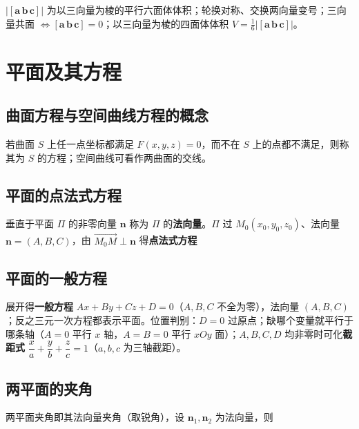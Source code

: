 $|[\boldsymbol a\,\boldsymbol b\,\boldsymbol c]|$ 为以三向量为棱的平行六面体体积；轮换对称、交换两向量变号；三向量共面 $\iff[\boldsymbol a\,\boldsymbol b\,\boldsymbol c]=0$；以三向量为棱的四面体体积 $V=\frac16\bigl|[\boldsymbol a\,\boldsymbol b\,\boldsymbol c]\bigr|$。


\section{平面及其方程}

\subsection{曲面方程与空间曲线方程的概念}

若曲面 $S$ 上任一点坐标都满足 $F(x,y,z)=0$，而不在 $S$ 上的点都不满足，则称其为 $S$ 的方程；空间曲线可看作两曲面的交线。

\subsection{平面的点法式方程}

垂直于平面 $\Pi$ 的非零向量 $\boldsymbol n$ 称为 $\Pi$ 的\textbf{法向量}。$\Pi$ 过 $M_0(x_0,y_0,z_0)$、法向量 $\boldsymbol n=(A,B,C)$，由 $\overrightarrow{M_0M}\perp\boldsymbol n$ 得\textbf{点法式方程}


\subsection{平面的一般方程}

展开得\textbf{一般方程} $Ax+By+Cz+D=0$（$A,B,C$ 不全为零），法向量 $(A,B,C)$；反之三元一次方程都表示平面。位置判别：$D=0$ 过原点；缺哪个变量就平行于哪条轴（$A=0$ 平行 $x$ 轴，$A=B=0$ 平行 $xOy$ 面）；$A,B,C,D$ 均非零时可化\textbf{截距式} $\dfrac xa+\dfrac yb+\dfrac zc=1$（$a,b,c$ 为三轴截距）。

\subsection{两平面的夹角}

两平面夹角即其法向量夹角（取锐角），设 $\boldsymbol n_1,\boldsymbol n_2$ 为法向量，则

